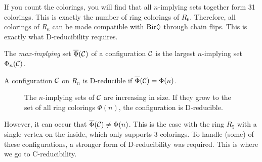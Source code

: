 If you count the colorings, you will find that all $n$-implying sets together form 31 colorings. This is exactly the number of ring colorings of $R_6$. Therefore, all colorings of $R_6$ can be made compatible with $\text{Bir}\Diamond$ through chain flips. This is exactly what D-reducibility requires.

\begin{definition}
    The \emph{max-implying} set $\overline{\Phi}(\mathcal{C})$ of a configuration $\mathcal{C}$ is the largest $n$-implying set  $\Phi_n(\mathcal{C})$.
\end{definition}

\begin{definition}
    A configuration $\mathcal{C}$ on $R_n$ is D-reducible if $\overline{\Phi}(\mathcal{C}) = \Phi(n)$.
\end{definition}

\begin{figure}[!h]
    \centering

    \caption{The $n$-implying sets of $\mathcal{C}$ are increasing in size. If they grow to the set of all ring colorings $\Phi(n)$, the configuration is D-reducible. }
\end{figure}

However, it can occur that $\overline{\Phi}(\mathcal{C}) \neq \Phi(n)$. This is the case with the ring $R_5$ with a single vertex on the inside, which only supports 3-colorings. To handle (some) of these configurations, a stronger form of D-reducibility was required. This is where we go to C-reducibility.